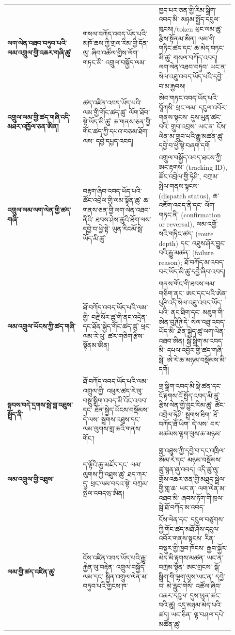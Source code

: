 \documentclass[11pt]{article}
\begin{document}
\begin{longtable}{P{0.31\linewidth} P{0.31\linewidth} P{0.31\linewidth}}
\textbf{ལག་ལེན་འཐབ་བཏུབ་པའི་ ལམ་འགྲུལ་གྱི་འཆར་གཞི་ཚུ་} & གསལ་བཀོད་འབད་ཡོད་པའི་མཁོ་ཆས་ཀྱི་གྲལ་རིམ་གྱི་དོན་ལུ་ ཞིབ་འཚོལ་གྱིས་ལོག་གཏང་མི་ འགྲུལ་བསྐྱོད་ལམ་ & ཁྱད་པར་ཅན་གྱི་རིམ་སྒྲིག་འབད་མི་ མཉམ་སྤྱོད་དངུལ་ཁུངས།/token ཕྲང་ལམ་ཚུ་རྩིས་སྟོནམ་ཨིན། ལམ་གི་གཏིང་ཚད་དང་ ཆ་མེད་བཏང་མི་ཚུ་ གསལ་བཀོད་འབད། ལག་ལེན་འཐབ་བཏུབ་ ཡང་ན་ སེལ་འཐུ་འབད་ཡོད་པའི་དབྱེ་བ་མ་རྐྱབས། \\
\textbf{འགྲུལ་ལམ་གྱི་ཚད་གཞི་འདི་ མཐར་འཁྱོལ་ཅན་ཨིན།} & ཚད་འཛིན་འབད་ཡོད་པའི་ལམ་གྱི་གོང་ཚད་ཚུ་ ལོག་ཐོབ་སྟེ་ཡོད་མི་ཚུ་ ཆ་གནས་ཅན་གྱི་ གོང་ཚད་ཀྱི་དཔའ་བཅམ་ཐོག་ལས་ དབྱེ་དཔྱད་འབད། & ཨེབ་གཏང་འབད་ཡོད་པའི་བཱོཀསི་ ཕྲང་ལམ་ དངུལ་འབོར་གནས་སྟངས་ དུས་ཡུན་ཚང་བའི་ གྲུབ་འབྲས་ ཡང་ན་ ངོས་ལེན་མ་གྲུབ་པའི་རྒྱུ་མཚན་ཚུ་ དབྱེ་བ་ཕྱེ་སྟེ་བཞག་དགོ \\
\textbf{འགྲུལ་ལམ་ལག་ལེན་གྱི་ཚད་གཞི་} & བརྟག་ཞིབ་འབད་ཡོད་པའི་ཚོང་འབྲེལ་གྱི་ལམ་སྟོན་ཚུ་ ཆ་གནས་ཅན་གྱི་ལག་ལེན་འཐབ་ནིའི་ ཐབས་ཤེས་ཚུའི་ཐོག་ལས་ དབྱེ་བ་ཕྱེ་སྟེ་ ཡུན་རིངམོ་སྦེ་ཡོད་མི་ཚུ་ & འགྲུལ་བསྐྱོད་འབད་ཐངས་ཀྱི་ཨང་རྟགས་ (tracking ID), ཚོང་འབྲེལ་གྱི་ཧེཤི་, བཀྲམ་སྤེལ་གནས་སྟངས་ (dispatch status), ཆ་འཇོག་འབད་ནི་དང་ ལོག་གཏང་ནི་ (confirmation or reversal), ལམ་འགྱོ་སའི་གཏིང་ཚད་ (route depth) དང་ འཐུས་ཤོར་བྱུང་བའི་རྒྱུ་མཚན་ (failure reason); ཐོ་བཀོད་མ་འབད་བར་ཡོད་མི་ཚུ་དབྱེ་ཞིབ་འབད། \\
\textbf{ལམ་འགྲུལ་ཡོངས་ཀྱི་ཚད་གཞི་} & ཐོ་བཀོད་འབད་ཡོད་པའི་ལམ་གྱི་ བརྗེ་སོར་ཚུ་གི་ནང་འདྲེན་དང་ཐོན་སྐྱེད་གོང་ཚད་ཚུ་ ཕྲང་ལམ་རེ་ལུ་ ཚར་གཅིག་རྩིས་སྟོནམ་ཨིན། & གནས་གོང་གི་ཐབས་ལམ་གཅིག་ནང་ ཨང་དང་པའི་ཨེན་པུཊི་འདི་སེལ་འཐུ་འབད་ཡོད་པའི་ ནང་ཐིག་དང་ མཇུག་གི་ཨེན་བུཊིཊི་དེ་ སེལ་འཐུ་འབད་ཡོད་མི་ ཐོན་སྐྱེད་ཚུ་ལག་ལེན་འཐབ་ཨིན། སྒོ་སྒྲིག་མ་འབད་མི་ དཔལ་འབྱོར་གྱི་ཚད་གཞི་སྦེ་ ཨེ་རེ་ཆ་མཉམ་བསྡོམས་མི་དགོ། \\
\textbf{སྟབས་བདེ་དྲགས་སྦེ་གླ་འཐུས་སྤྲོད་ནི་} & ཐོ་བཀོད་འབད་ཡོད་པའི་ལམ་འགྲུལ་གྱི་ འཕུར་ཚད་རེ་ལུ་ བསྡུ་སྒྲིག་འབད་མི་འོང་འབབ་དང་ ཐོན་སྐྱེད་ཡོངས་བསྡོམས་ དེ་ལས་ སྦྲགས་འཐུས་དང་ ལམ་ལུགས་གླ་ཆའི་གནས་གོང་། & གྲ་སྒྲིག་འབད་མི་སྡེ་ཚན་དང་ ངོ་རྟགས་ངོ་སྤྲོད་འབད་མི་ཚུ་ རྩིས་ལེན་གྱི་བྱུང་རིམ་ཚུ་ ཚོང་འབྲེལ་ཧེཤི་ སྦྲགས་ཐིག་ ཐོ་བཀོད་ཐོ་ཡིག་ དེ་ལས་ བར་མཚམས་ལྷག་ལུས་ཆ་མཉམ་ \\
\textbf{ལམ་འགྲུལ་གྱི་འཐུས་} & ད་ལྟོའི་ཆུ་མཛོད་དང་ ལམ་ལུགས་ཀྱི་འཐུས་ཚུ་ ཐད་ཀར་དུ་ ཕྲང་ལམ་བདའ་སྟེ་ བཀྲམ་སྤེལ་འབདཝ་ཨིན། & གླ་འཐུས་ཀྱི་དབྱེ་བ་དང་འཁྲིལ་ ཨོམ་རེ་དང་ མཉམ་བསྡོམས་ཚུ་སྙན་ཞུ་འབད། འདི་ཚུ་ལུ་ གྲོས་འཆར་ཅན་གྱི་མཐུད་སྦྲེལ་གྱི་གླ་ཆ་ ཡང་ན་ ལག་ལེན་མ་འཐབ་མི་ ཞབས་ཏོག་གི་ཁྲལ་སྦེ་ཐོ་བཀོད་མ་འབད་ \\
\textbf{ལམ་གྱི་ཚད་འཛིན་ཚུ་} & ངོས་འཛིན་འབད་ཡོད་པའི་རྒྱུ་རྐྱེན་ལུ་བརྟེན་ འགྲུལ་བསྐྱོད་ལམ་དང་ སྐྱིན་འགྲུལ་ལེན་མ་བཏུབ་པའི་གྱངས་ཁ་ & ངོས་ལེན་དང་ དངུལ་བཙུགས་ཀྱི་གོང་ཚད་མཐོ་ཤོས་དངུལ་འབོར་གནས་སྟངས་ རིན་བསྡུར་གྱི་ཁྱབ་ཁོངས་ རྒྱབ་སྐྱོར་མེད་མི་རྟགས་མཚན་ ཡང་ན་ བཀྲམ་སྟོན་ ཨང་གྲངས་ སྒོ་སྒྲིག་གི་ལྷག་ལུས་ཡང་ན་ དབྱེ་བ་ མེ་རླུང་གེསི་ འཚོལ་ཞིབ་འཆར་དངུལ་ དུས་ཡུན་ཚང་བའི་ཚུ། འདྲ་མཉམ་མེད་པའི་ཚད། ཡང་ཅིན་ ལྟ་བཤལ་དཔེ་མཚོན་ཚུ་ \\

\end{longtable}
\end{document}
